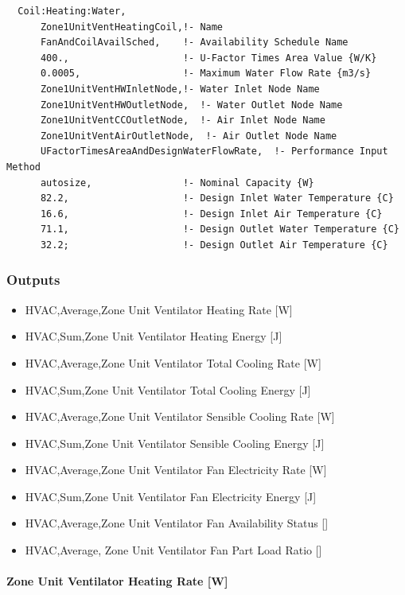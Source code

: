 \begin{lstlisting}
  Coil:Heating:Water,
      Zone1UnitVentHeatingCoil,!- Name
      FanAndCoilAvailSched,    !- Availability Schedule Name
      400.,                    !- U-Factor Times Area Value {W/K}
      0.0005,                  !- Maximum Water Flow Rate {m3/s}
      Zone1UnitVentHWInletNode,!- Water Inlet Node Name
      Zone1UnitVentHWOutletNode,  !- Water Outlet Node Name
      Zone1UnitVentCCOutletNode,  !- Air Inlet Node Name
      Zone1UnitVentAirOutletNode,  !- Air Outlet Node Name
      UFactorTimesAreaAndDesignWaterFlowRate,  !- Performance Input Method
      autosize,                !- Nominal Capacity {W}
      82.2,                    !- Design Inlet Water Temperature {C}
      16.6,                    !- Design Inlet Air Temperature {C}
      71.1,                    !- Design Outlet Water Temperature {C}
      32.2;                    !- Design Outlet Air Temperature {C}
\end{lstlisting}

\subsubsection{Outputs}\label{outputs-2-028}

\begin{itemize}
\item
  HVAC,Average,Zone Unit Ventilator Heating Rate {[}W{]}
\item
  HVAC,Sum,Zone Unit Ventilator Heating Energy {[}J{]}
\item
  HVAC,Average,Zone Unit Ventilator Total Cooling Rate {[}W{]}
\item
  HVAC,Sum,Zone Unit Ventilator Total Cooling Energy {[}J{]}
\item
  HVAC,Average,Zone Unit Ventilator Sensible Cooling Rate {[}W{]}
\item
  HVAC,Sum,Zone Unit Ventilator Sensible Cooling Energy {[}J{]}
\item
  HVAC,Average,Zone Unit Ventilator Fan Electricity Rate {[}W{]}
\item
  HVAC,Sum,Zone Unit Ventilator Fan Electricity Energy {[}J{]}
\item
  HVAC,Average,Zone Unit Ventilator Fan Availability Status {[]}
\item
  HVAC,Average, Zone Unit Ventilator Fan Part Load Ratio {[]}
\end{itemize}

\paragraph{Zone Unit Ventilator Heating Rate {[}W{]}}\label{zone-unit-ventilator-heating-rate-w}

